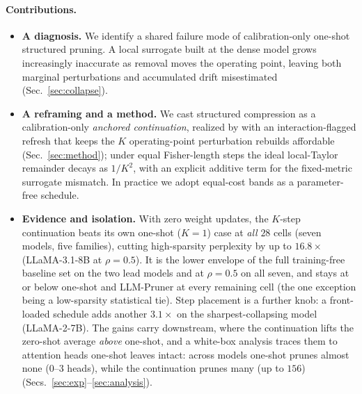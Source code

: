 \paragraph{Contributions.}
\begin{itemize}
\item \textbf{A diagnosis.} 
We identify a shared failure mode of calibration-only one-shot structured pruning. A local surrogate built at the dense model grows increasingly inaccurate as removal moves the operating point, leaving both marginal perturbations and accumulated drift misestimated (Sec.~\ref{sec:collapse}).

\item \textbf{A reframing and a method.} We cast structured compression as a calibration-only
\emph{anchored continuation}, realized by \method with an interaction-flagged refresh that keeps the $K$
operating-point perturbation rebuilds affordable (Sec.~\ref{sec:method}); under equal Fisher-length steps
the ideal local-Taylor remainder decays as $1/K^2$, with an explicit additive term for the fixed-metric
surrogate mismatch. In practice we adopt equal-cost bands as a parameter-free schedule.
\item \textbf{Evidence and isolation.} With zero weight updates, the $K$-step continuation beats its own
one-shot ($K{=}1$) case at \emph{all} $28$ cells (seven models, five families), cutting high-sparsity
perplexity by up to $16.8\times$ (LLaMA-3.1-8B at $\rho{=}0.5$). It is the lower envelope of the full
training-free baseline set on the two lead models and at $\rho{=}0.5$ on all seven, and stays at or below
one-shot and LLM-Pruner at every remaining cell (the one exception being a low-sparsity statistical tie). Step
placement is a further knob: a front-loaded schedule adds another $3.1\times$ on the sharpest-collapsing
model (LLaMA-2-7B). The gains carry downstream, where the continuation lifts the zero-shot average
\emph{above} one-shot, and a white-box analysis traces them to attention heads one-shot leaves intact:
across models one-shot prunes almost none ($0$--$3$ heads), while the continuation prunes many (up to $156$)
(Secs.~\ref{sec:exp}--\ref{sec:analysis}).
\end{itemize}
